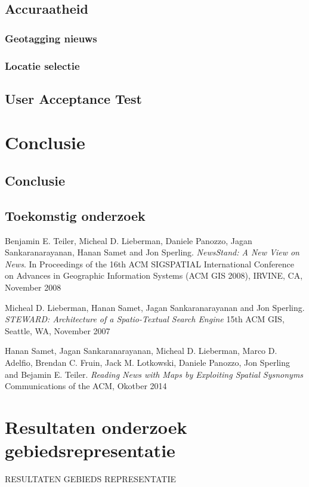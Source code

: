 \documentclass[twoside,openright]{uva-bachelor-thesis}
\begin{document}
	\section{Accuraatheid}
		\subsection{Geotagging nieuws}
		\subsection{Locatie selectie}
	\section{User Acceptance Test}
	
\chapter{Conclusie}
	\section{Conclusie}
	\section{Toekomstig onderzoek}
	
\begin{thebibliography}{9}
	Benjamin E. Teiler, Micheal D. Lieberman, Daniele Panozzo, Jagan Sankaranarayanan, Hanan Samet and Jon Sperling.
	\textit{NewsStand: A New View on News}. 
	In Proceedings of the 16th ACM SIGSPATIAL International Conference on Advances in Geographic Information Systems (ACM GIS 2008), IRVINE, CA, November 2008
	
	Micheal D. Lieberman, Hanan Samet, Jagan Sankaranarayanan and Jon Sperling.
	\textit{STEWARD: Architecture of a Spatio-Textual Search Engine}
	15th ACM GIS, Seattle, WA, November 2007
	
	Hanan Samet, Jagan Sankaranarayanan, Micheal D. Lieberman, Marco D. Adelfio, Brendan C. Fruin, Jack M. Lotkowski, Daniele Panozzo, Jon Sperling and Bejamin E. Teiler.
	\textit{Reading News with Maps by Exploiting Spatial Sysnonyms}
	Communications of the ACM, Okotber 2014
\end{thebibliography}
\newpage
\appendix
\chapter{Resultaten onderzoek gebiedsrepresentatie}
\label{app:results_rep}
RESULTATEN GEBIEDS REPRESENTATIE
\end{document}
